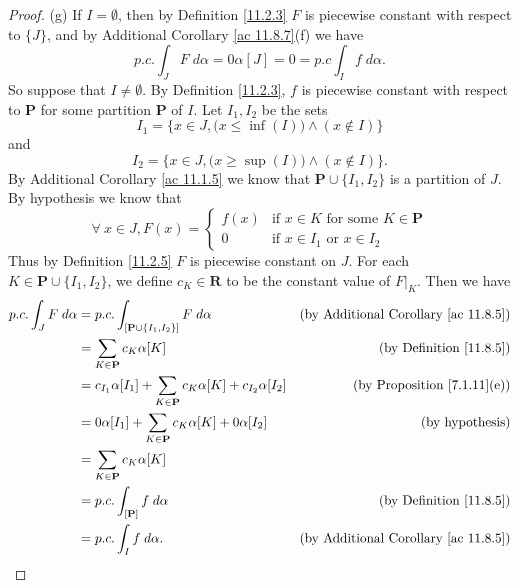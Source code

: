 \begin{proof}{(g)}
    If \(I = \emptyset\), then by Definition \ref{11.2.3} \(F\) is piecewise constant with respect to \(\{J\}\), and by Additional Corollary \ref{ac 11.8.7}(f) we have
    \[
        p.c. \int_J F \; d \alpha = 0 \alpha[J] = 0 = p.c \int_I f \; d \alpha.
    \]
    So suppose that \(I \neq \emptyset\).
    By Definition \ref{11.2.3}, \(f\) is piecewise constant with respect to \(\mathbf{P}\) for some partition \(\mathbf{P}\) of \(I\).
    Let \(I_1, I_2\) be the sets
    \[
        I_1 = \Big\{x \in J, \big(x \leq \inf(I)\big) \land (x \notin I)\Big\}
    \]
    and
    \[
        I_2 = \Big\{x \in J, \big(x \geq \sup(I)\big) \land (x \notin I)\Big\}.
    \]
    By Additional Corollary \ref{ac 11.1.5} we know that \(\mathbf{P} \cup \{I_1, I_2\}\) is a partition of \(J\).
    By hypothesis we know that
    \[
        \forall\ x \in J, F(x) = \begin{cases}
            f(x) & \text{if } x \in K \text{ for some } K \in \mathbf{P} \\
            0    & \text{if } x \in I_1 \text{ or } x \in I_2
        \end{cases}
    \]
    Thus by Definition \ref{11.2.5} \(F\) is piecewise constant on \(J\).
    For each \(K \in \mathbf{P} \cup \{I_1, I_2\}\), we define \(c_K \in \mathbf{R}\) to be the constant value of \(F|_K\).
    Then we have
    \begin{align*}
        p.c. \int_J F \; d \alpha & = p.c. \int_{[\mathbf{P} \cup \{I_1, I_2\}]} F \; d \alpha                          & \text{(by Additional Corollary \ref{ac 11.8.5})} \\
                                  & = \sum_{K \in \mathbf{P}} c_K \alpha[K]                                             & \text{(by Definition \ref{11.8.5})}              \\
                                  & = c_{I_1} \alpha[I_1] + \sum_{K \in \mathbf{P}} c_K \alpha[K] + c_{I_2} \alpha[I_2] & \text{(by Proposition \ref{7.1.11}(e))}          \\
                                  & = 0 \alpha[I_1] + \sum_{K \in \mathbf{P}} c_K \alpha[K] + 0 \alpha[I_2]             & \text{(by hypothesis)}                           \\
                                  & = \sum_{K \in \mathbf{P}} c_K \alpha[K]                                                                                                \\
                                  & = p.c. \int_{[\mathbf{P}]} f \; d \alpha                                            & \text{(by Definition \ref{11.8.5})}              \\
                                  & = p.c. \int_I f \; d \alpha.                                                        & \text{(by Additional Corollary \ref{ac 11.8.5})}
    \end{align*}
\end{proof}

